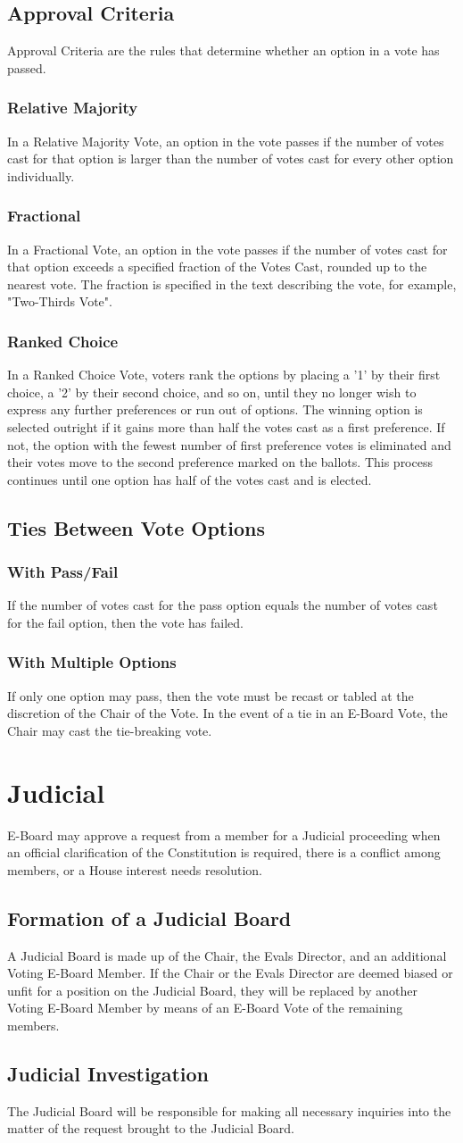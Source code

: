 \documentclass{article}
\newcommand{\article}[1]{\section{#1} \label{#1}}
\newcommand{\asection}[1]{\subsection{#1} \label{#1}}
\newcommand{\asubsection}[1]{\subsubsection{#1} \label{#1}}
\begin{document}
\asection{Approval Criteria}
Approval Criteria are the rules that determine whether an option in a vote has passed.

\asubsection{Relative Majority}
In a Relative Majority Vote, an option in the vote passes if the number of votes cast for that option is larger than the number of votes cast for every other option individually.

\asubsection{Fractional}
In a Fractional Vote, an option in the vote passes if the number of votes cast for that option exceeds a specified fraction of the Votes Cast, rounded up to the nearest vote.
The fraction is specified in the text describing the vote, for example, "Two-Thirds Vote".

\asubsection{Ranked Choice}
In a Ranked Choice Vote, voters rank the options by placing a '1' by their first choice, a '2' by their second choice, and so on, until they no longer wish to express any further preferences or run out of options.
The winning option is selected outright if it gains more than half the votes cast as a first preference.
If not, the option with the fewest number of first preference votes is eliminated and their votes move to the second preference marked on the ballots.
This process continues until one option has half of the votes cast and is elected.

\asection{Ties Between Vote Options}

\asubsection{With Pass/Fail}
If the number of votes cast for the pass option equals the number of votes cast for the fail option, then the vote has failed.

\asubsection{With Multiple Options}
If only one option may pass, then the vote must be recast or tabled at the discretion of the Chair of the Vote.
In the event of a tie in an E-Board Vote, the Chair may cast the tie-breaking vote.

\article{Judicial}
E-Board may approve a request from a member for a Judicial proceeding when an official clarification of the Constitution is required, there is a conflict among members, or a House interest needs resolution.

\asection{Formation of a Judicial Board}
A Judicial Board is made up of the Chair, the Evals Director, and an additional Voting E-Board Member.
If the Chair or the Evals Director are deemed biased or unfit for a position on the Judicial Board, they will be replaced by another Voting E-Board Member by means of an E-Board Vote of the remaining members.

\asection{Judicial Investigation}
The Judicial Board will be responsible for making all necessary inquiries into the matter of the request brought to the Judicial Board.
\end{document}
